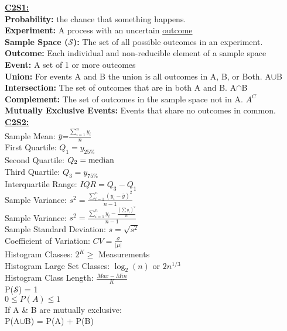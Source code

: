 \documentclass[letter, 12pt]{article}
\begin{document}
\newpage
\begin{multicols}{2}
\textbf{\uline{C2S1:}}\\
\textbf{Probability:} the chance that something happens.\\
\textbf{Experiment:} A process with an uncertain \uline{outcome}\\
\textbf{Sample Space ($\mathscr{S}$):} The set of all possible outcomes in an experiment.\\
\textbf{Outcome:} Each individual and non-reducible element of a sample space\\
\textbf{Event:} A set of 1 or more outcomes\\
\textbf{Union:} For events A and B the union is all outcomes in A, B, or Both. A$\cup$B\\
\textbf{Intersection:} The set of outcomes that are in both A and B. A$\cap$B\\
\textbf{Complement:} The set of outcomes in the sample space not in A. $A^C$\\
\textbf{Mutually Exclusive Events:} Events that share no outcomes in common.\\
\textbf{\uline{C2S2:}}\\
\vfill
\columnbreak
\vspace*{\fill}
Sample Mean: $\bar{y}$=$\frac{\sum_{i=1}^n y_i}{n}$\\
First Quartile: $Q_1=y_{25\%}$\\
Second Quartile: $Q_2=\textnormal{median}$\\
Third Quartile: $Q_3=y_{75\%}$\\
Interquartile Range: $IQR=Q_3-Q_1$\\
Sample Variance: $s^2=\frac{\sum_{i=1}^n (y_i-\bar{y})^2}{n-1}$\\
Sample Variance: $s^2=\frac{\sum_{i=1}^n y_i - \frac{(\sum y_i)^2}{n}}{n-1}$\\
Sample Standard Deviation: $s=\sqrt{s^2}$\\
Coefficient of Variation: $CV=\frac{\sigma}{\lvert\mu\rvert}$\\
Histogram Classes: $2^K \geq$ Measurements\\
Histogram Large Set Classes: $\log_2(n)$ or $2n^{1/3}$\\
Histogram Class Length: $\frac{Max-Min}{K}$\\
P($\mathscr{S}$) = 1\\
$0\leq P(A) \leq 1$\\
If A \& B are mutually exclusive:\\ P(A$\cup$B) = P(A) + P(B)\\ 

\end{multicols}
\end{document}
